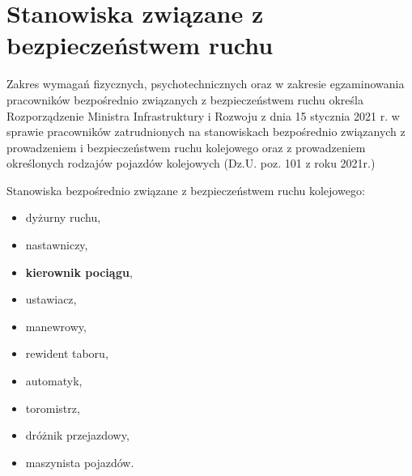 \chapter{Stanowiska związane z bezpieczeństwem ruchu}
Zakres wymagań fizycznych, psychotechnicznych oraz w zakresie egzaminowania pracowników bezpośrednio związanych z bezpieczeństwem ruchu określa Rozporządzenie Ministra Infrastruktury i Rozwoju z dnia 15 stycznia 2021 r. w sprawie pracowników zatrudnionych na stanowiskach bezpośrednio związanych z prowadzeniem i bezpieczeństwem ruchu kolejowego oraz z prowadzeniem określonych rodzajów pojazdów kolejowych (Dz.U. poz. 101 z roku 2021r.)

Stanowiska bezpośrednio związane z bezpieczeństwem ruchu kolejowego: 
\begin{itemize}
	\item dyżurny ruchu, 
	\item nastawniczy, 
	\item \textbf{kierownik pociągu}, 
	\item ustawiacz, 
	\item manewrowy, 
	\item rewident taboru, 
	\item automatyk, 
	\item toromistrz, 
	\item dróżnik przejazdowy,
	\item maszynista pojazdów.
\end{itemize}

